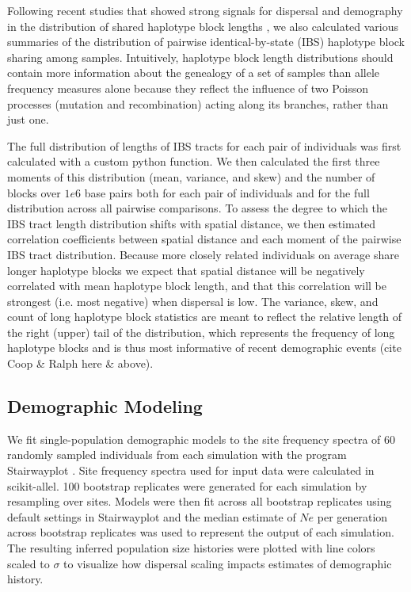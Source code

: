 \documentclass[9pt,twocolumn,twoside,lineno]{gsajnl}
\begin{document}
Following recent studies that showed strong signals for dispersal and demography in the distribution of shared haplotype block lengths \citep{Ringbauer2017,Baharian2016}, we also calculated various summaries of the distribution of pairwise identical-by-state (IBS) haplotype block sharing among samples. Intuitively, haplotype block length distributions should contain more information about the genealogy of a set of samples than allele frequency measures alone because they reflect the influence of two Poisson processes (mutation and recombination) acting along its branches, rather than just one. 

The full distribution of lengths of IBS tracts for each pair of individuals was first calculated with a custom python function. We then calculated the first three moments of this distribution (mean, variance, and skew) and the number of blocks over $1e6$ base pairs both for each pair of individuals and for the full distribution across all pairwise comparisons. To assess the degree to which the IBS tract length distribution shifts with spatial distance, we then estimated correlation coefficients between spatial distance and each moment of the pairwise IBS tract distribution. Because more closely related individuals on average share longer haplotype blocks we expect that spatial distance will be negatively correlated with mean haplotype block length, and that this correlation will be strongest (i.e. most negative) when dispersal is low. The variance, skew, and count of long haplotype block statistics are meant to reflect the relative length of the right (upper) tail of the distribution, which represents the frequency of long haplotype blocks and is thus most informative of recent demographic events \citep{Ringbauer2017} (cite Coop \& Ralph here \& above). 

\subsection{Demographic Modeling}
We fit single-population demographic models to the site frequency spectra of 60 randomly sampled individuals from each simulation with the program Stairwayplot \citep{Liu2015}. Site frequency spectra used for input data were calculated in scikit-allel. 100 bootstrap replicates were generated for each simulation by resampling over sites. Models were then fit across all bootstrap replicates using default settings in Stairwayplot and the median estimate of $Ne$ per generation across bootstrap replicates was used to represent the output of each simulation. The resulting inferred population size histories were plotted with line colors scaled to $\sigma$ to visualize how dispersal scaling impacts estimates of demographic history.  
\end{document}
